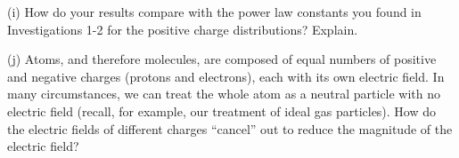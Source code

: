 (i) How do your results compare with the power law constants you found
in Investigations 1-2 for the positive charge distributions? Explain.\vspace{15mm}

(j) Atoms, and therefore molecules, are composed of equal numbers of positive
and negative charges (protons and electrons), each with its own electric
field. In many circumstances, we can treat the whole atom as a neutral
particle with no electric field (recall, for example, our treatment
of ideal gas particles). How do the electric fields of different charges
{}``cancel'' out to reduce the magnitude of the electric field?\vspace{15mm}

